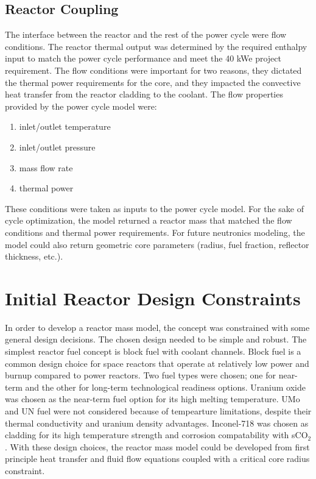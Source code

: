 \subsection{Reactor Coupling}
The interface between the reactor and the rest of the power cycle were flow
conditions. The reactor thermal output was determined by the required enthalpy
input to match the power cycle performance and meet the 40 kWe project
requirement. The flow conditions were important for two reasons, they dictated
the thermal power requirements for the core, and they impacted the convective
heat transfer from the reactor cladding to the coolant. The flow properties
provided by the power cycle model were:

\begin{enumerate}
    \item inlet/outlet temperature
    \item inlet/outlet pressure
    \item mass flow rate
    \item thermal power
\end{enumerate}

These conditions were taken as inputs to the power cycle model. For the sake of
cycle optimization, the model returned a reactor mass that matched the flow
conditions and thermal power requirements. For future neutronics modeling, the
model could also return geometric core parameters (radius, fuel fraction,
reflector thickness, etc.). 

\section{Initial Reactor Design Constraints}
    In order to develop a reactor mass model, the concept was constrained with
some general design decisions. The chosen design needed to be simple and robust. The simplest reactor fuel concept is block fuel with coolant channels. 
Block fuel is a common design choice for space reactors that operate at relatively 
low power and burnup compared to power reactors. Two fuel types were chosen; one for
near-term and the other for long-term technological readiness options. Uranium
oxide was chosen as the near-term fuel option for its high melting temperature.
UMo and UN fuel were not considered because of tempearture limitations, despite
their thermal conductivity and uranium density advantages. Inconel-718 was
chosen as cladding for its high temperature strength and corrosion
compatability with sCO$_2$. With these design choices, the reactor mass model
could be developed from first principle heat transfer and fluid flow equations
coupled with a critical core radius constraint.

